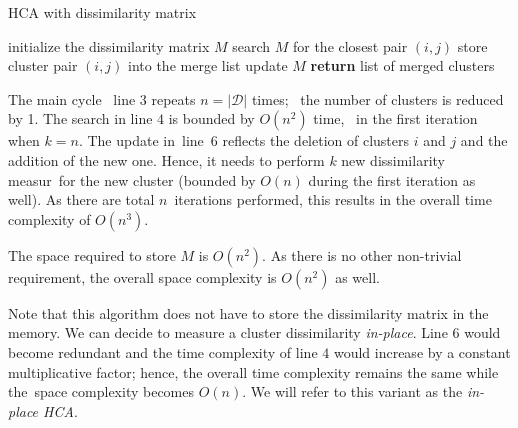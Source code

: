 \begin{algorithm}[t]
	\caption{HCA with dissimilarity matrix}
	\label{alg01:dismat}
	\begin{algorithmic}[1]
		\State initialize the dissimilarity matrix $M$
		\State search $M$ for the closest pair $(i,j)$ 
		\State store cluster pair $(i,j)$ into the merge list 
		\State update $M$ 
		\EndFor
		\State \textbf{return} list of merged clusters
		\EndProcedure
	\end{algorithmic}
\end{algorithm}

The main cycle \ line $3$ repeats $n = |\mathcal{D}|$ times; \ the number of clusters is reduced by 1. The search in line $4$ is bounded by $O(n^2)$ time, \ in the first iteration when $k=n$. The update in~line~$6$ reflects the deletion of clusters $i$ and $j$ and the addition of the new one. Hence, it needs to perform $k$ new dissimilarity measur\ for the new cluster (bounded by $O(n)$ during the first iteration as well). As there are total $n$~iterations performed, this results in the overall time complexity of $O(n^3)$. 

The space required to store $M$ is $O(n^2)$. As there is no other non-trivial requirement, the overall space complexity is $O(n^2)$ as well.

\begin{rem}
	Note that this algorithm does not have to store the dissimilarity matrix in the memory. We can decide to measure a cluster dissimilarity \emph{in-place}. Line $6$ would become redundant and the time complexity of line $4$ would increase by a constant multiplicative factor; hence, the overall time complexity remains the same while the~space complexity becomes $O(n)$. We will refer to this variant as the \emph{in-place HCA}.
\end{rem}


